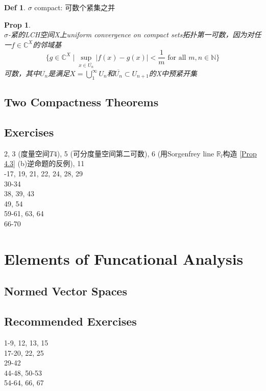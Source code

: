 \documentclass[hidelinks]{article}
\theoremstyle{definition}
\newtheorem*{defin}{Def}
\theoremstyle{plain}
\newtheorem{proposition}[theorem]{Prop}
\theoremstyle{remark}
\begin{document}
\begin{defin}
$\sigma$ compact: 可数个紧集之并
\end{defin}

\begin{proposition}~\\
$\sigma$-紧的LCH空间X上uniform convergence on compact sets拓扑第一可数，因为对任一$f\in \mathbb{C}^X$的邻域基
\[
\bigg\{g\in \mathbb{C}^X\mid \sup_{x\in \overline{U_n}}|f(x)-g(x)|<\frac{1}{m}\textrm{ for all }m,n\in \mathbb{N} \bigg\} 
\]
可数，其中$U_n$是满足$X=\bigcup_{1}^{\infty}U_n$和$\overline{U_n}\subset U_{n+1}$的X中预紧开集
\end{proposition}



\subsection{Two Compactness Theorems}



\subsection{Exercises}
2, 3 (度量空间$T4$), 5 (可分度量空间第二可数), 6 (用Sorgenfrey line $\mathbb{R}_l$构造 \autoref{Prop 4.3} (b)逆命题的反例), 11 \\
-17, 19, 21, 22, 24, 28, 29 \\
30-34 \\
38, 39, 43 \\
49, 54 \\
59-61, 63, 64 \\
66-70 \\
\newpage


\section{Elements of Funcational Analysis}

\subsection{Normed Vector Spaces}










\subsection{Recommended Exercises}
1-9, 12, 13, 15 \\
17-20, 22, 25 \\
29-42 \\
44-48, 50-53 \\
54-64, 66, 67 \\
\end{document}
